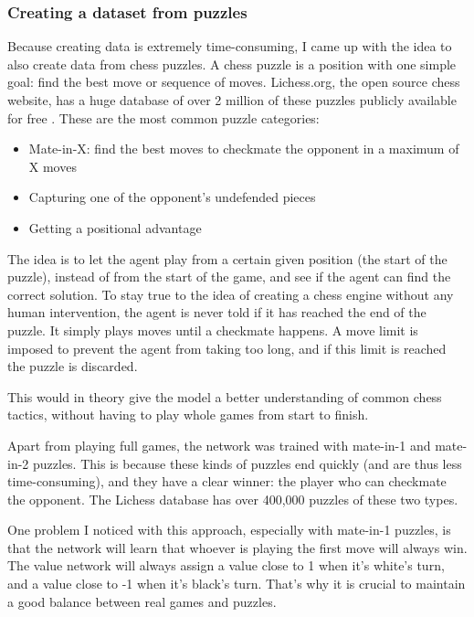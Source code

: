 \documentclass{article}
\begin{document}
\subsubsection{Creating a dataset from puzzles}

Because creating data is extremely time-consuming, I came up with the idea to also
create data from chess puzzles. A chess puzzle is a position with one simple goal: find the best move or sequence of moves.
Lichess.org, the open source chess website, has a huge database of over 2 million of these puzzles publicly available for free \cite{LichessOrgOpen}. 
These are the most common puzzle categories:

\begin{itemize}
    \item Mate-in-X: find the best moves to checkmate the opponent in a maximum of X moves
    \item Capturing one of the opponent's undefended pieces
    \item Getting a positional advantage
\end{itemize}

The idea is to let the agent play from a certain given position (the start of the puzzle), 
instead of from the start of the game, and see if the agent can find the correct solution.
To stay true to the idea of creating a chess engine without any human intervention,
the agent is never told if it has reached the end of the puzzle. It simply plays moves
until a checkmate happens. A move limit is imposed to prevent the agent from taking too long, 
and if this limit is reached the puzzle is discarded. 

This would in theory give the model a better understanding of common chess tactics, without having to play
whole games from start to finish. 

Apart from playing full games, the network was trained with mate-in-1 and mate-in-2 puzzles. 
This is because these kinds of puzzles end quickly (and are thus less time-consuming), 
and they have a clear winner: the player who can checkmate the opponent.
The Lichess database has over 400,000 puzzles of these two types. 

One problem I noticed with this approach, especially with mate-in-1 puzzles, is that 
the network will learn that whoever is playing the first move will always win. 
The value network will always assign a value close to 1 when it's white's turn, 
and a value close to -1 when it's black's turn.
That's why it is crucial to maintain a good balance between real games and puzzles.
\end{document}
